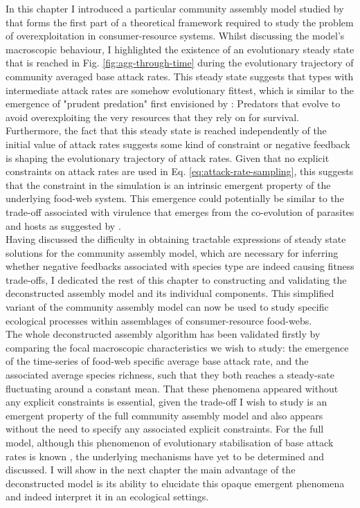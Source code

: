 \documentclass[a4paper]{report}
\begin{document}
In this chapter I introduced a particular community assembly model studied by \citep{Rossberg2013} that forms the first part of a theoretical framework required to study the problem of overexploitation in consumer-resource systems. Whilst discussing the model's macroscopic behaviour, I highlighted the existence of an evolutionary steady state that is reached in Fig. \ref{fig:agg-through-time} during the evolutionary trajectory of community averaged base attack rates. This steady state suggests that types with intermediate attack rates are somehow evolutionary fittest, which is similar  to the emergence of "prudent predation" first envisioned by \citep{Slobodkin1968}: Predators that evolve to avoid overexploiting the very resources that they rely on for survival. Furthermore, the fact that this steady state is reached independently of the initial value of attack rates suggests some kind of constraint or negative feedback is shaping the evolutionary trajectory of attack rates. Given that no explicit constraints on attack rates are used in Eq. \eqref{eq:attack-rate-sampling}, this suggests that the constraint in the simulation is an intrinsic emergent property of the underlying food-web system. This emergence could potentially be similar to the trade-off associated with virulence that emerges from the co-evolution of parasites and hosts as suggested by \citep{Goodnight2008}. \\

Having discussed the difficulty in obtaining tractable expressions of steady state solutions for the community assembly model, which are necessary for inferring whether negative feedbacks associated with species type are indeed causing fitness trade-offs, I dedicated the rest of this chapter to constructing and validating the deconstructed assembly model and its individual components. This simplified variant of the community assembly model can now be used to study specific ecological processes within assemblages of consumer-resource food-webs. \\


The whole deconstructed assembly algorithm has been validated firstly by comparing the focal macroscopic characteristics we wish to study: the emergence of the time-series of food-web specific average base attack rate, and the associated average species richness, such that they both reaches a steady-sate fluctuating around a constant mean. That these phenomena appeared without any explicit constraints is essential, given the trade-off I wish to study is an emergent property of the full community assembly model and also appears without the need to specify any associated explicit constraints. For the full model, although this phenomenon of evolutionary stabilisation of base attack rates is known \cite[Fig.~20.8]{Rossberg2013}, the
underlying mechanisms have yet to be determined and discussed. I will show in the next chapter the main advantage of the deconstructed model is its ability to elucidate this opaque emergent phenomena and indeed interpret it in an ecological settings. \\
\end{document}
